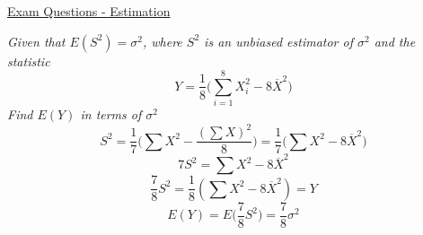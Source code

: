 \documentclass{article}[18pt]
\begin{document}
\begin{center}
\underline{\huge Exam Questions - Estimation}
\end{center}
\textit{Given that $E(S^2)=\sigma^2$, where $S^2$ is an unbiased estimator of $\sigma^2$ and the statistic}
$$Y=\frac{1}{8}\Bigg(\sum^8_{i=1}X^2_i-8\overline{X}^2\Bigg)$$
\textit{Find $E(Y)$ in terms of $\sigma^2$}
$$S^2=\frac{1}{7}\Bigg(\sum X^2-\frac{(\sum X)^2}{8}\Bigg)=\frac{1}{7}\Bigg(\sum X^2-8\overline{X}^2\Bigg)$$
$$7S^2=\sum X^2-8\overline{X}^2$$
$$\frac{7}{8}S^2=\frac{1}{8}(\sum X^2-8\overline{X}^2)=Y$$
$$E(Y)=E\Big(\frac{7}{8}S^2\Big)=\frac{7}{8}\sigma^2$$
\end{document}

